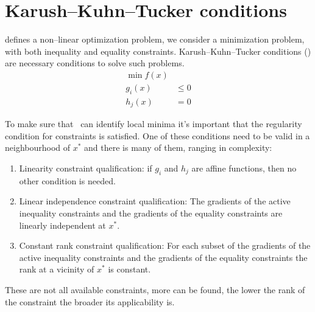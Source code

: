 \chapter{Karush--Kuhn--Tucker conditions}
\label{app:kkt}
 defines a non--linear optimization problem, we consider a minimization
problem, with both inequality and equality constraints. Karush--Kuhn--Tucker conditions (\kkt) are
necessary conditions to solve such problems.
\begin{equation}
	\label{eq:opt-problem}
	\begin{aligned}
		\min{f(x)} &        \\
		g_i(x)     & \leq 0 \\
		h_j(x)     & = 0
	\end{aligned}
\end{equation}

To make sure that \kkt\ can identify local minima it's important that the regularity condition for
constraints is satisfied. One of these conditions need to be valid in a neighbourhood of $x^*$ and
there is many of them, ranging in complexity:
\begin{enumerate}
	\item Linearity constraint qualification: if $g_i$ and $h_j$ are affine functions, then no
	      other condition is needed.
	\item Linear independence constraint qualification: The gradients of the active inequality
	      constraints and the gradients of the equality constraints are linearly independent at $x^*$.
	\item Constant rank constraint qualification: For each subset of the gradients of the active
	      inequality constraints and the gradients of the equality constraints the rank at a vicinity
	      of $x^*$ is constant.
\end{enumerate}
These are not all available constraints, more can be found, the lower the rank of the
constraint the broader its applicability is.

